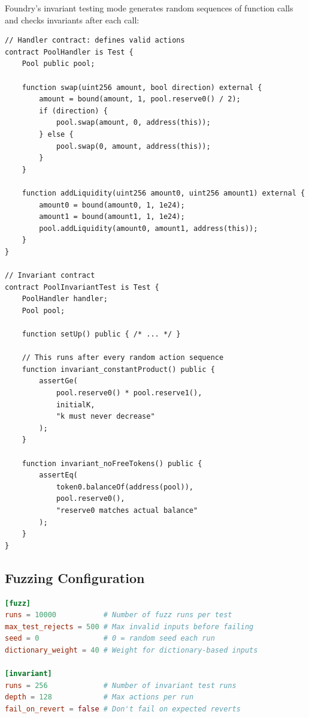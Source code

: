 Foundry's invariant testing mode generates random sequences of function calls and
checks invariants after each call:

\begin{lstlisting}[language=Solidity,caption={Stateful invariant test}]
// Handler contract: defines valid actions
contract PoolHandler is Test {
    Pool public pool;

    function swap(uint256 amount, bool direction) external {
        amount = bound(amount, 1, pool.reserve0() / 2);
        if (direction) {
            pool.swap(amount, 0, address(this));
        } else {
            pool.swap(0, amount, address(this));
        }
    }

    function addLiquidity(uint256 amount0, uint256 amount1) external {
        amount0 = bound(amount0, 1, 1e24);
        amount1 = bound(amount1, 1, 1e24);
        pool.addLiquidity(amount0, amount1, address(this));
    }
}

// Invariant contract
contract PoolInvariantTest is Test {
    PoolHandler handler;
    Pool pool;

    function setUp() public { /* ... */ }

    // This runs after every random action sequence
    function invariant_constantProduct() public {
        assertGe(
            pool.reserve0() * pool.reserve1(),
            initialK,
            "k must never decrease"
        );
    }

    function invariant_noFreeTokens() public {
        assertEq(
            token0.balanceOf(address(pool)),
            pool.reserve0(),
            "reserve0 matches actual balance"
        );
    }
}
\end{lstlisting}

\subsection{Fuzzing Configuration}

\begin{lstlisting}[language=TOML,caption={foundry.toml fuzz configuration}]
[fuzz]
runs = 10000           # Number of fuzz runs per test
max_test_rejects = 500 # Max invalid inputs before failing
seed = 0               # 0 = random seed each run
dictionary_weight = 40 # Weight for dictionary-based inputs

[invariant]
runs = 256             # Number of invariant test runs
depth = 128            # Max actions per run
fail_on_revert = false # Don't fail on expected reverts
\end{lstlisting}

